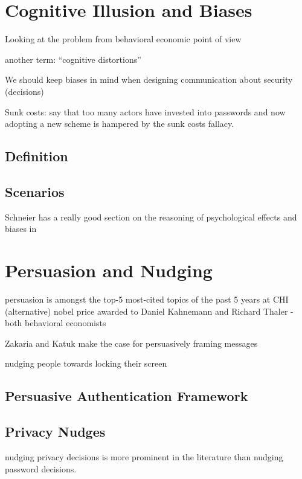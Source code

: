 \section{Cognitive Illusion and Biases}
Looking at the problem from behavioral economic point of view

another term: ``cognitive distortions''

We should keep biases in mind when designing communication about security (decisions) \cite{Garg2013HeuristicsAndBiases}

Sunk costs: \cite{Herley2012PersistenceOfPasswords} say that too many actors have invested into passwords and now adopting a new scheme is hampered by the sunk costs fallacy.
	\subsection{Definition}
	\subsection{Scenarios}
	

Schneier has a really good section on the reasoning of psychological effects and biases in \cite{Schneier2008PsychologySecurity} 
	
	
\section{Persuasion and Nudging}

persuasion is amongst the top-5 most-cited topics of the past 5 years at CHI
(alternative) nobel price awarded to Daniel Kahnemann and Richard Thaler - both behavioral economists

\cite{Zakaria2013DesigningEffectiveSecurityMessages} Zakaria and Katuk make the case for persuasively framing messages


nudging people towards locking their screen \cite{Bruggen2013ModifiyngUnlockingBehavior}

	\subsection{Persuasive Authentication Framework}
	\subsection{Privacy Nudges}
	nudging privacy decisions is more prominent in the literature than nudging password decisions. 

